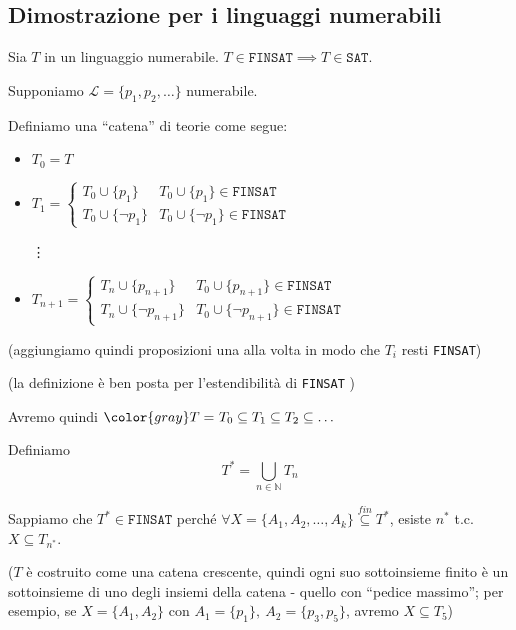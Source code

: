 \documentclass[a4paper,11pt]{report}
\begin{document}
\subsection{Dimostrazione per i linguaggi numerabili}

\begin{gbox}[colframe=DeepGreen, colback=DeepGreenLight]{}
    Sia \( T\) in un linguaggio numerabile. \( T \in \texttt{FINSAT} \implies T\in \texttt{SAT}\).
\end{gbox}

Supponiamo \( \mathcal{L}=\{p_1, p_2, \dots\}\) numerabile. 

Definiamo una ``catena'' di teorie come segue:
\begin{itemize}
    \item \( T_0 = T \)
    \item \( T_1 = \begin{cases}
            T_0 \cup \{p_1\} & T_0 \cup \{p_1\} \in \texttt{FINSAT} \\
            T_0 \cup \{\neg p_1\} & T_0 \cup \{\neg p_1\} \in \texttt{FINSAT}
        \end{cases} \)

        \hspace{1em}\vdots

    \item \( T_{n+1} = \begin{cases}
            T_n \cup \{p_{n+1}\} & T_0 \cup \{p_{n+1}\} \in \texttt{FINSAT} \\
            T_n \cup \{\neg p_{n+1}\} & T_0 \cup \{\neg p_{n+1}\} \in \texttt{FINSAT}
        \end{cases} \)
\end{itemize}

(aggiungiamo quindi proposizioni una alla volta in modo che \( T_i \) resti \texttt{FINSAT})

\begin{gbox}{}
    (la definizione è ben posta per l'estendibilità di \texttt{FINSAT} )
\end{gbox}

Avremo quindi \( {\color{gray} T = }\ T_0 \subseteq T_1 \subseteq T_2 \subseteq \dots \)

Definiamo \[ T^* = \bigcup_{n\in \mathbb{N}} T_n \]

Sappiamo che \( T^* \in \texttt{FINSAT} \) perché \( \forall X = \{A_1, A_2, \dots, A_k\} \overset{fin}{\subseteq} T^*\), esiste \( n^* \) t.c. \( X \subseteq T_{n^*} \).

(\( T \) è costruito come una catena crescente, quindi ogni suo sottoinsieme finito è un sottoinsieme di uno degli insiemi della catena - quello con ``pedice massimo'';
per esempio, se \( X = \{A_1, A_2\} \) con \( A_1 = \{p_1\}, \ A_2 = \{p_3, p_5\}\), avremo \( X \subseteq T_5 \))
\end{document}

